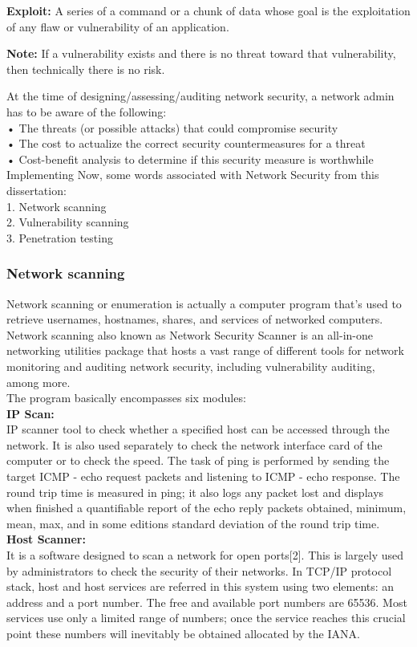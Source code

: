 \documentclass[conference]{IEEEtran}
\begin{document}
\textbf{Exploit: } A series of a command or a chunk of data whose goal is the exploitation of any flaw or vulnerability of an application.

\textbf{Note: } If a vulnerability exists and there is no threat toward that vulnerability, then technically there is no risk.

At the time of designing/assessing/auditing network security, a network admin has to be aware of the following:
\\• The threats (or possible attacks) that could compromise security
\\• The cost to actualize the correct security countermeasures for a threat
\\• Cost-benefit analysis to determine if this security measure is worthwhile Implementing Now, some words associated with Network Security from this dissertation:
\\1. Network scanning
\\2. Vulnerability scanning
\\3. Penetration testing

\subsubsection{Network scanning}
Network scanning or enumeration is actually a computer program that's used to retrieve usernames, hostnames, shares, and services of networked computers. Network scanning also known as Network Security Scanner is an all-in-one networking utilities package that hosts a vast range of different tools for network monitoring and auditing network security, including vulnerability auditing, among more.
\\The program basically encompasses six modules:
\\\textbf{IP Scan:}
\\IP scanner tool to check whether a specified host can be accessed through the network. It is also used separately to check the network interface card of the computer or to check the speed. The task of ping is performed by sending the target ICMP - echo request packets and listening to ICMP - echo response. The round trip time is measured in ping; it also logs any packet lost and displays when finished a quantifiable report of the echo reply packets obtained, minimum, mean, max, and in some editions standard deviation of the round trip time.
\\\textbf{Host Scanner:}
\\It is a software designed to scan a network for open ports[2]. This is largely used by administrators to check the security of their networks. In TCP/IP protocol stack, host and host services are referred in this system using two elements: an address and a port number. The free and available port numbers are 65536. Most services use only a limited range of numbers; once the service reaches this crucial point these numbers will inevitably be obtained allocated by the IANA.
\end{document}
